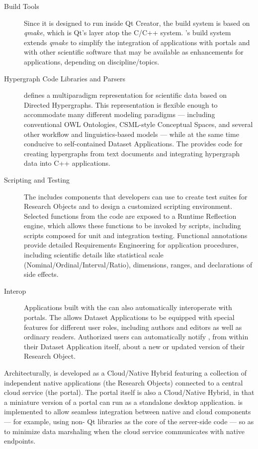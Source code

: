 \documentclass[11pt,letterpaper]{article}
\begin{document}
\begin{description}
\item[Build Tools]  Since it is designed to run 
inside Qt Creator, the {\RAK} build system 
is based on \textit{qmake}, which is Qt's 
layer atop the C/C++  system.  
{\lfMOSAIC}'s build system extends \textit{qmake} to 
simplify the integration of {\RAK} applications 
with {\MOSAIC} portals and with other scientific 
software that may be available as enhancements 
for {\RAK} applications, depending on  
discipline/topics.
\item[Hypergraph Code Libraries and Parsers]  
{\lfMOSAIC} defines a multiparadigm representation for 
scientific data based on Directed Hypergraphs.  
This representation is flexible enough to 
accommodate many different modeling 
paradigms --- including 
conventional OWL Ontologies, 
CSML-style Conceptual Spaces, and 
several other workflow and linguistics-based models 
--- while at the same time conducive to self-contained 
Dataset Applications.  The {\MOSAIC} {\SDK} provides 
code for creating hypergraphs from text documents and 
integrating hypergraph data into C++ applications.
\item[Scripting and Testing]  The {\MOSAIC} {\SDK} includes 
components that developers can use to create 
test suites for Research Objects and to design a 
customized scripting environment.  Selected 
functions from the {\RO} code are exposed 
to a Runtime Reflection engine, which allows these 
functions to be invoked by scripts, including 
scripts composed for unit and integration testing.  
Functional annotations provide detailed Requirements 
Engineering for application procedures, including scientific 
details like statistical scale (Nominal/Ordinal/Interval/Ratio),
dimensions, ranges, and declarations of side effects.
\item[{\lMOSAIC} Interop]  Applications built 
with the {\MOSAIC} {\SDK} can also automatically 
interoperate with {\MOSAIC} portals.  The {\SDK} 
allows Dataset Applications to be equipped 
with special features for different user roles, 
including authors and editors as well as ordinary readers.  
Authorized 
users can automatically notify {\MOSAIC}, 
from within their Dataset Application itself, about 
a new or updated version of their Research Object.
\end{description}
\p{}
Architecturally, {\MOSAIC} is developed as a 
Cloud/Native Hybrid featuring a collection of 
independent native applications (the {\RAK} 
Research Objects) connected to a central 
cloud service (the {\MOSAIC} portal).  The portal 
itself is also a Cloud/Native Hybrid, in that a 
miniature version of a {\MOSAIC} portal can run 
as a standalone desktop application.  {\lfMOSAIC} 
is implemented to allow seamless integration between 
native and cloud components --- for example, 
using non-{\GUI} Qt libraries as the core of the 
server-side code --- so as to minimize data 
marshaling when the cloud service 
communicates with native endpoints.
\end{document}
